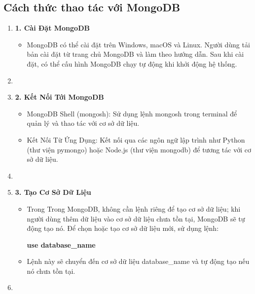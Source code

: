 \subsection{Cách thức thao tác với MongoDB} 
\begin{enumerate}
    \item []\hspace*{0.3cm}\textbf{1. Cài Đặt MongoDB}
    \begin{itemize}[left = 0.5cm]
        \item []MongoDB có thể cài đặt trên Windows, macOS và Linux. Người dùng tải bản cài đặt từ trang chủ MongoDB và làm theo hướng dẫn. Sau khi cài đặt, có thể cấu hình MongoDB chạy tự động khi khởi động hệ thống.
    \end{itemize}
    \item[] 
    \item []\hspace*{0.3cm}\textbf{2. Kết Nối Tới MongoDB}
    \begin{itemize}[left = 0.5cm]
        \item [$\bullet$]MongoDB Shell (mongosh): Sử dụng lệnh mongosh trong terminal để quản lý và thao tác với cơ sở dữ liệu.

        \item [$\bullet$]Kết Nối Từ Ứng Dụng: Kết nối qua các ngôn ngữ lập trình như Python (thư viện pymongo) hoặc Node.js (thư viện mongodb) để tương tác với cơ sở dữ liệu.
    \end{itemize}
    \newpage
    \item[] 
    \item []\hspace*{0.3cm}\textbf{3. Tạo Cơ Sở Dữ Liệu}
    \begin{itemize}[left = 0.5cm]
        \item []Trong Trong MongoDB, không cần lệnh riêng để tạo cơ sở dữ liệu; khi người dùng thêm dữ liệu vào cơ sở dữ liệu chưa tồn tại, MongoDB sẽ tự động tạo nó. Để chọn hoặc tạo cơ sở dữ liệu mới, sử dụng lệnh:
        \begin{center}
            \textbf{use database\_name}
        \end{center}
         \item []Lệnh này sẽ chuyển đến cơ sở dữ liệu database\_name và tự động tạo nếu nó chưa tồn tại.
        
    \end{itemize}
    \item[]
     

\end{enumerate}
